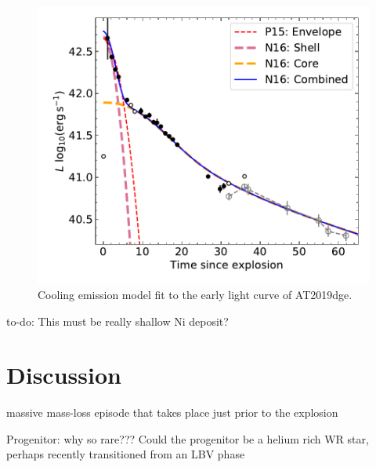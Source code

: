 \documentclass[twocolumn]{aastex63}
\newcommand{\todo}[1]{{\color{magenta} to-do: {#1}}}
\begin{document}
\begin{CJK*}{UTF8}{gbsn}
\begin{figure}[htbp!]
	\centering
	\includegraphics[width=\columnwidth]{figures/envelope.pdf}
	\caption{Cooling emission model fit to the early light curve of AT2019dge. 
		\label{fig:envelope}}
\end{figure}

\todo{This must be really shallow Ni deposit?}


\section{Discussion}
massive mass-loss episode that takes place just prior to the explosion \citep{Shiode2014}

Progenitor: why so rare???
Could the progenitor be a helium rich WR star, perhaps recently transitioned from an LBV phase 


\end{CJK*}
\end{document}
